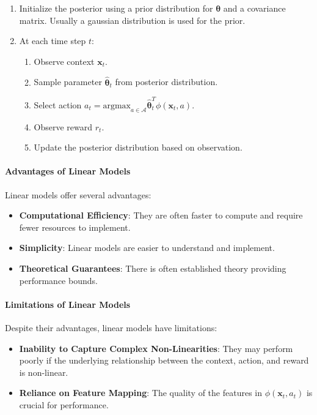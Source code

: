 \begin{itemize}
    \begin{enumerate}
    \item Initialize the posterior using a prior distribution for $\boldsymbol{\theta}$ and a covariance matrix. Usually a gaussian distribution is used for the prior.
    \item At each time step $t$:
      \begin{enumerate}
        \item Observe context $\mathbf{x}_t$.
        \item Sample parameter $\hat{\boldsymbol{\theta}}_t$ from posterior distribution.
        \item Select action $a_t = \text{argmax}_{a \in \mathcal{A}} \hat{\boldsymbol{\theta}}_t^T \phi(\mathbf{x}_t, a)$.
        \item Observe reward $r_t$.
        \item Update the posterior distribution based on observation.
      \end{enumerate}
    \end{enumerate}
\end{itemize}

\paragraph{Advantages of Linear Models}
Linear models offer several advantages:
\begin{itemize}
    \item \textbf{Computational Efficiency}: They are often faster to compute and require fewer resources to implement.
    \item \textbf{Simplicity}: Linear models are easier to understand and implement.
    \item \textbf{Theoretical Guarantees}: There is often established theory providing performance bounds.
\end{itemize}

\paragraph{Limitations of Linear Models}
Despite their advantages, linear models have limitations:
\begin{itemize}
    \item \textbf{Inability to Capture Complex Non-Linearities}: They may perform poorly if the underlying relationship between the context, action, and reward is non-linear.
    \item \textbf{Reliance on Feature Mapping}: The quality of the features in $\phi(\mathbf{x}_t,a_t)$ is crucial for performance.
\end{itemize}

